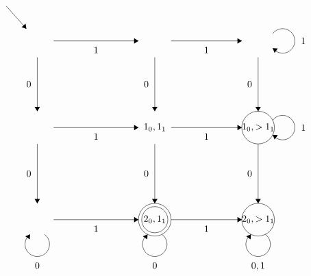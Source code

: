 \documentclass[12pt]{article}
\theoremstyle{definition}
\theoremstyle{remark}
\begin{document}
\begin{enumerate}[leftmargin=\labelsep]
\begin{align*}
\begin{tikzpicture}[scale=0.2]
				\draw (34,-31) node {$1_0,1_1$};
				\draw [black] (53,-31) circle (3);
				\draw (53,-31) node {$1_0,>1_1$};
				\draw [black] (34,-47.9) circle (3);
				\draw (34,-47.9) node {$2_0,1_1$};
				\draw [black] (34,-47.9) circle (2.4);
				\draw [black] (53,-47.9) circle (3);
				\draw (53,-47.9) node {$2_0,>1_1$};
				\draw [black] (6.7,-8.7) -- (10.4,-12.86);
				\fill [black] (10.4,-12.86) -- (10.25,-11.93) -- (9.5,-12.59);
				\draw [black] (12.4,-18.1) -- (12.4,-28);
				\fill [black] (12.4,-28) -- (12.9,-27.2) -- (11.9,-27.2);
				\draw (11.9,-23.05) node [left] {$0$};
				\draw [black] (15.4,-15.1) -- (31,-15.1);
				\fill [black] (31,-15.1) -- (30.2,-14.6) -- (30.2,-15.6);
				\draw (23.2,-15.6) node [below] {$1$};
				\draw [black] (37,-15.1) -- (50,-15.1);
				\fill [black] (50,-15.1) -- (49.2,-14.6) -- (49.2,-15.6);
				\draw (43.5,-15.6) node [below] {$1$};
				\draw [black] (15.4,-31) -- (31,-31);
				\fill [black] (31,-31) -- (30.2,-30.5) -- (30.2,-31.5);
				\draw (23.2,-31.5) node [below] {$1$};
				\draw [black] (37,-31) -- (50,-31);
				\fill [black] (50,-31) -- (49.2,-30.5) -- (49.2,-31.5);
				\draw (43.5,-31.5) node [below] {$1$};
				\draw [black] (15.4,-47.9) -- (31,-47.9);
				\fill [black] (31,-47.9) -- (30.2,-47.4) -- (30.2,-48.4);
				\draw (23.2,-48.4) node [below] {$1$};
				\draw [black] (37,-47.9) -- (50,-47.9);
				\fill [black] (50,-47.9) -- (49.2,-47.4) -- (49.2,-48.4);
				\draw (43.5,-48.4) node [below] {$1$};
				\draw [black] (12.4,-34) -- (12.4,-44.9);
				\fill [black] (12.4,-44.9) -- (12.9,-44.1) -- (11.9,-44.1);
				\draw (11.9,-39.45) node [left] {$0$};
				\draw [black] (34,-34) -- (34,-44.9);
				\fill [black] (34,-44.9) -- (34.5,-44.1) -- (33.5,-44.1);
				\draw (33.5,-39.45) node [left] {$0$};
				\draw [black] (53,-34) -- (53,-44.9);
				\fill [black] (53,-44.9) -- (53.5,-44.1) -- (52.5,-44.1);
				\draw (52.5,-39.45) node [left] {$0$};
				\draw [black] (53,-18.1) -- (53,-28);
				\fill [black] (53,-28) -- (53.5,-27.2) -- (52.5,-27.2);
				\draw (52.5,-23.05) node [left] {$0$};
				\draw [black] (34,-18.1) -- (34,-28);
				\fill [black] (34,-28) -- (34.5,-27.2) -- (33.5,-27.2);
				\draw (33.5,-23.05) node [left] {$0$};
				\draw [black] (13.723,-50.58) arc (54:-234:2.25);
				\draw (12.4,-55.15) node [below] {$0$};
				\fill [black] (11.08,-50.58) -- (10.2,-50.93) -- (11.01,-51.52);
				\draw [black] (35.323,-50.58) arc (54:-234:2.25);
				\draw (34,-55.15) node [below] {$0$};
				\fill [black] (32.68,-50.58) -- (31.8,-50.93) -- (32.61,-51.52);
				\draw [black] (54.323,-50.58) arc (54:-234:2.25);
				\draw (53,-55.15) node [below] {$0,1$};
				\fill [black] (51.68,-50.58) -- (50.8,-50.93) -- (51.61,-51.52);
				\draw [black] (55.68,-29.677) arc (144:-144:2.25);
				\draw (60.25,-31) node [right] {$1$};
				\fill [black] (55.68,-32.32) -- (56.03,-33.2) -- (56.62,-32.39);
				\draw [black] (55.68,-13.777) arc (144:-144:2.25);
				\draw (60.25,-15.1) node [right] {$1$};
				\fill [black] (55.68,-16.42) -- (56.03,-17.3) -- (56.62,-16.49);
			\end{tikzpicture}
		\end{align*}
	\end{enumerate}
\end{document}
